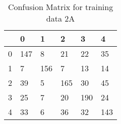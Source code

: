 
\begin{table}[]
    \centering
\begin{tabular}{|l|l|l|l|l|l|}
\hline
&0&1&2&3&4\\
\hline
0&147&8&21&22&35\\
\hline
1&7&156&7&13&14\\
\hline
2&39&5&165&30&45\\
\hline
3&25&7&20&190&24\\
\hline
4&33&6&36&32&143\\
\hline
\end{tabular}
\caption{Confusion Matrix for training data 2A}
    \label{tab:conf_train2a}
\end{table}
